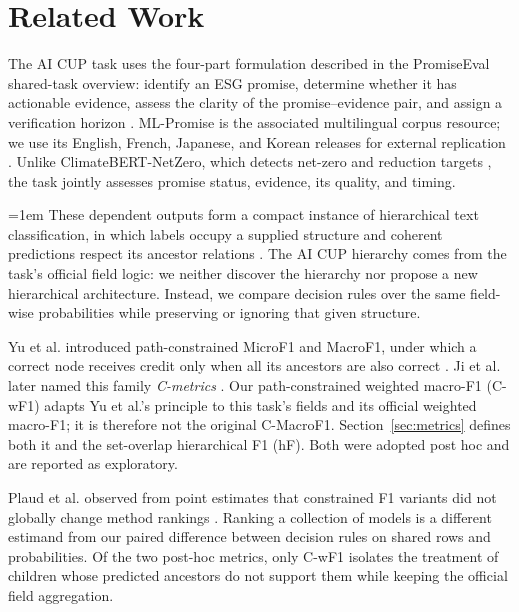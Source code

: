 \section{Related Work}

The AI CUP task uses the four-part formulation described in the PromiseEval
shared-task overview: identify an ESG promise, determine whether it has
actionable evidence, assess the clarity of the promise--evidence pair, and
assign a verification horizon
\cite{chen2025promiseeval}. ML-Promise is the associated
multilingual corpus resource; we use its English, French, Japanese, and Korean
releases for external replication \cite{seki2025mlpromise}. Unlike
ClimateBERT-NetZero, which detects net-zero and reduction targets
\cite{schimanski2023climatebert}, the task jointly assesses promise status,
evidence, its quality, and timing.

\begingroup\emergencystretch=1em
These dependent outputs form a compact instance of hierarchical text
classification, in which labels occupy a supplied structure and coherent
predictions respect its ancestor relations \cite{plaud2024revisiting}. The AI
CUP hierarchy comes from the task's official field logic: we neither discover
the hierarchy nor propose a new hierarchical architecture. Instead, we compare
decision rules over the same field-wise probabilities while preserving or
ignoring that given structure.
\par\endgroup

Yu et al. introduced path-constrained MicroF1 and MacroF1, under which a
correct node receives credit only when all its ancestors are also correct
\cite{yu2022constrained}. Ji et al. later named this family \emph{C-metrics}
\cite{ji2023hierarchical}. Our path-constrained weighted macro-F1 (C-wF1)
adapts Yu et al.'s principle to this task's fields and its official
weighted macro-F1; it is therefore not the original C-MacroF1.
Section~\ref{sec:metrics} defines both it and the set-overlap hierarchical
F1 (hF). Both were adopted post hoc and are reported as exploratory.

Plaud et al. observed from point estimates that constrained F1 variants did not
globally change method rankings \cite{plaud2024revisiting}. Ranking a
collection of models is a different estimand from our paired difference
between decision rules on shared rows and probabilities. Of the two post-hoc
metrics, only C-wF1 isolates the treatment of children whose predicted
ancestors do not support them while keeping the official field aggregation.

